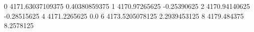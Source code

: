 0 4171.63037109375 0.40380859375
1 4170.97265625 -0.25390625
2 4170.94140625 -0.28515625
4 4171.2265625 0.0
6 4173.5205078125 2.2939453125
8 4179.484375 8.2578125

